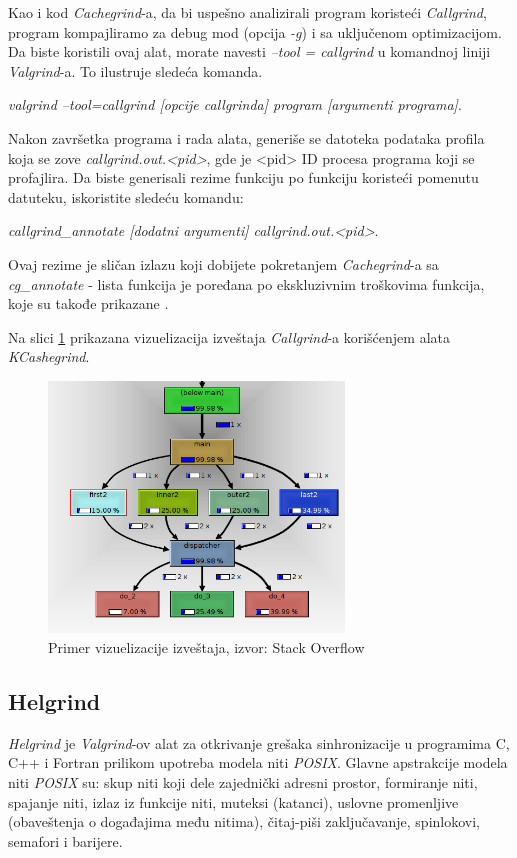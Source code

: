 \documentclass[12pt,oneside]{memoir}
\theoremstyle{plain}
\theoremstyle{definition}
\begin{document}
Kao i kod \textit{Cachegrind}-a, da bi uspešno analizirali program koristeći \textit{Callgrind}, program kompajliramo za debug mod (opcija \textit{-g}) i sa uključenom optimizacijom. Da biste koristili ovaj alat, morate navesti \textit{--tool = callgrind} u komandnoj liniji \textit{Valgrind}-a. To ilustruje sledeća komanda.
\begin{center}
\textit{valgrind --tool=callgrind [opcije callgrinda] program [argumenti programa]}.
\end{center}

Nakon završetka programa i rada alata, generiše se datoteka podataka profila koja se zove \textit{callgrind.out.<pid>}, gde je <pid> ID procesa programa koji se profajlira. Da biste generisali rezime funkciju po funkciju koristeći pomenutu datuteku, iskoristite sledeću komandu:
\begin{center}
\textit{callgrind\_annotate [dodatni argumenti] callgrind.out.<pid>}.
\end{center}

Ovaj rezime je sličan izlazu koji dobijete  pokretanjem \textit{Cachegrind}-a sa \textit{cg\_annotate} -  lista funkcija je poređana po ekskluzivnim troškovima funkcija, koje su takođe  prikazane \cite{Callgrind}. 

Na slici \ref{fig:slika2.18} prikazana vizuelizacija izveštaja \textit{Callgrind}-a korišćenjem alata \textit{KCashegrind}.
\begin{figure}[!ht]
  \centering
  \includegraphics[width=0.7\textwidth]{MUjHe.png}
  \caption{Primer vizuelizacije izveštaja, izvor: Stack Overflow}
  \label{fig:slika2.18}
\end{figure}

\subsection{Helgrind}\label{HelgrindSection}
\textit{Helgrind} je \textit{Valgrind}-ov alat za otkrivanje grešaka sinhronizacije u programima C, C++ i Fortran prilikom upotreba modela niti \textit{POSIX}. Glavne apstrakcije modela niti  \textit{POSIX} su: skup niti koji dele zajednički adresni prostor, formiranje niti, spajanje niti, izlaz iz funkcije niti, muteksi (katanci), uslovne promenljive (obaveštenja o događajima među nitima), čitaj-piši zaključavanje, spinlokovi, semafori i barijere.
\end{document}

